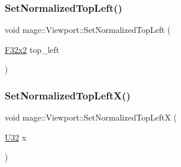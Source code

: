 \hypertarget{classmage_1_1_viewport_affccf7a7033463ba8d2b9cc4c9ae790b}{}\label{classmage_1_1_viewport_affccf7a7033463ba8d2b9cc4c9ae790b} 
\subsubsection{\texorpdfstring{Set\+Normalized\+Top\+Left()}{SetNormalizedTopLeft()}\hspace{0.1cm}{\footnotesize\ttfamily [4/4]}}
{\footnotesize\ttfamily void mage\+::\+Viewport\+::\+Set\+Normalized\+Top\+Left (\begin{DoxyParamCaption}\item[{\hyperlink{namespacemage_aa87237ad091f5cd7da612b8523fc108f}{F32x2}}]{top\+\_\+left }\end{DoxyParamCaption})\hspace{0.3cm}{\ttfamily [noexcept]}}

\hypertarget{classmage_1_1_viewport_a55f7e01e6f7c184665548fe5259b6bdd}{}\label{classmage_1_1_viewport_a55f7e01e6f7c184665548fe5259b6bdd} 
\subsubsection{\texorpdfstring{Set\+Normalized\+Top\+Left\+X()}{SetNormalizedTopLeftX()}\hspace{0.1cm}{\footnotesize\ttfamily [1/2]}}
{\footnotesize\ttfamily void mage\+::\+Viewport\+::\+Set\+Normalized\+Top\+LeftX (\begin{DoxyParamCaption}\item[{\hyperlink{namespacemage_a41c104c036fba3756a74e19f793eeaa1}{U32}}]{x }\end{DoxyParamCaption})\hspace{0.3cm}{\ttfamily [noexcept]}}

\hypertarget{classmage_1_1_viewport_a48d6fbbc9023ae69f7c77cd2c199d37d}{}\label{classmage_1_1_viewport_a48d6fbbc9023ae69f7c77cd2c199d37d} 
